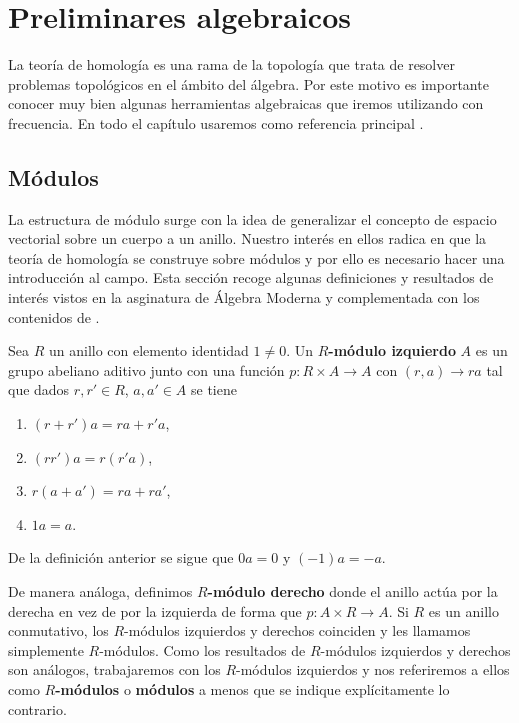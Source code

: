 
\chapter{Preliminares algebraicos}
La teoría de homología es una rama de la topología que trata de resolver
problemas topológicos en el ámbito del álgebra. Por este motivo es importante conocer
muy bien algunas herramientas algebraicas que iremos utilizando con frecuencia.
En todo el capítulo usaremos como referencia principal
\cite{maclane2012homology}.

\section{Módulos}

La estructura de módulo surge con la idea de generalizar el concepto de espacio vectorial
sobre un cuerpo a un anillo. Nuestro interés en ellos radica en que la teoría de
homología se construye sobre módulos y por ello es necesario hacer una
introducción al campo. Esta sección recoge algunas definiciones y resultados de interés
vistos en la asginatura de Álgebra Moderna y complementada con los contenidos de
\cite{dummit2004abstract}.

\begin{definicion}
	Sea \(R\) un anillo con elemento identidad \(1 \neq 0\). Un \textbf{\(R\)-módulo
	izquierdo} \(A\) es un grupo abeliano aditivo junto con una función \(p: R \times
	A \rightarrow A\) con \((r, a) \to ra\) tal que dados \(r,r' \in R\), \(a,a' \in A\)
	se tiene
	\begin{enumerate}
		\item \((r+r') a = r a + r' a\),
		\item \((rr') a = r (r' a)\),
		\item \(r(a+a') = ra + ra'\),
		\item \(1a = a\).
	\end{enumerate}
\end{definicion}

De la definición anterior se sigue que \(0a = 0\) y \((-1)a = -a\).

De manera análoga, definimos \textbf{\(R\)-módulo derecho} donde el anillo actúa
por la derecha en vez de por la izquierda de forma que
\(p: A \times R \rightarrow A\). Si \(R\) es un anillo conmutativo, los \(R\)-módulos
izquierdos y derechos coinciden y les llamamos simplemente \(R\)-módulos. Como los
resultados de \(R\)-módulos izquierdos y derechos son análogos, trabajaremos con
los \(R\)-módulos izquierdos y nos referiremos a ellos como \textbf{\(R\)-módulos} o
\textbf{módulos} a menos que se indique explícitamente lo contrario.

